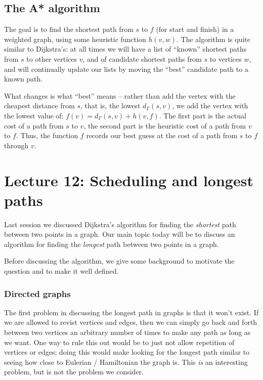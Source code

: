 \documentclass[]{article}
\begin{document}
\subsection{The A* algorithm}\label{the-a-algorithm}

The goal is to find the shortest path from \(s\) to \(f\) (for start and
finish) in a weighted graph, using some heuristic function \(h(v,w)\).
The algorithm is quite similar to Dijkstra's: at all times we will have
a list of ``known'' shortest paths from \(s\) to other vertices \(v\),
and of candidate shortest paths from \(s\) to vertices \(w\), and will
continually update our lists by moving the ``best'' candidate path to a
known path.

What changes is what ``best'' means -- rather than add the vertex with
the cheapest distance from \(s\), that is, the lowest \(d_\Gamma(s,v)\),
we add the vertex with the lowest value of:
\(f(v)=d_\Gamma(s,v)+h(v,f)\). The first part is the actual cost of a
path from \(s\) to \(v\), the second part is the heuristic cost of a
path from \(v\) to \(f\). Thus, the function \(f\) records our best
guess at the cost of a path from \(s\) to \(f\) through \(v\).

\section{Lecture 12: Scheduling and longest paths}

Last session we discussed Dijkstra's algorithm for finding the
\emph{shortest} path between two points in a graph. Our main topic today
will be to discuss an algorithm for finding the \emph{longest} path
between two points in a graph.

Before discussing the algorithm, we give some background to motivate the
question and to make it well defined.

\subsubsection{Directed graphs}\label{directed-graphs}

The first problem in discussing the longest path in graphs is that it
won't exist. If we are allowed to revist vertices and edges, then we can
simply go back and forth between two vertices an arbitrary number of
times to make any path as long as we want. One way to rule this out
would be to just not allow repetition of vertices or edges; doing this
would make looking for the longest path similar to seeing how close to
Eulerian / Hamiltonian the graph is. This \emph{is} an interesting
problem, but is not the problem we consider.
\end{document}
